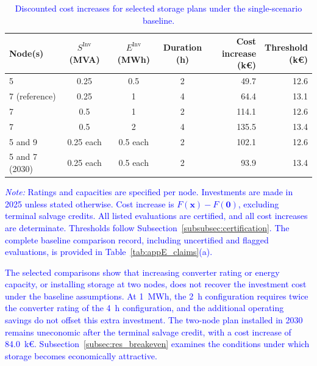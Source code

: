 \documentclass[preprint,12pt]{elsarticle}
\begin{document}
\begin{table}[htbp!]
    \centering
    \caption{\textcolor{blue}{Discounted cost increases for selected storage
    plans under the single-scenario baseline.}}
    \label{tab:res_value_ladder}
    \footnotesize
    \setlength{\tabcolsep}{4pt}
    \begin{tabular}{l c c c r r}
        \toprule
        Node(s)
        & \shortstack{$S^{\text{Inv}}$\\(MVA)}
        & \shortstack{$E^{\text{Inv}}$\\(MWh)}
        & \shortstack{Duration\\(h)}
        & \shortstack{Cost increase\\(k\euro{})}
        & \shortstack{Threshold\\(k\euro{})} \\
        \midrule
        5               & 0.25 & 0.5 & 2 & 49.7 & 12.6 \\
        7 (reference)   & 0.25 & 1 & 4 & 64.4 & 13.1 \\
        7               & 0.5 & 1 & 2 & 114.1 & 12.6 \\
        7               & 0.5 & 2 & 4 & 135.5 & 13.4 \\
        5 and 9         & 0.25 each & 0.5 each & 2 & 102.1 & 12.6 \\
        5 and 7 (2030)  & 0.25 each & 0.5 each & 2 & 93.9 & 13.4 \\
        \bottomrule
    \end{tabular}
    \par\smallskip
    \begin{minipage}{\linewidth}
        \footnotesize\raggedright
        \textcolor{blue}{\textit{Note:}
        Ratings and capacities are specified per node. Investments are made in 2025 unless stated otherwise.
        Cost increase is $F(\boldsymbol{x})-F(\boldsymbol{0})$, excluding terminal salvage credits.
        All listed evaluations are certified, and all cost increases are determinate. Thresholds follow Subsection~\ref{subsubsec:certification}.
        The complete baseline comparison record, including uncertified and flagged evaluations, is provided in Table~\ref{tab:appE_claims}(a).}
    \end{minipage}
\end{table}

\textcolor{blue}{
    The selected comparisons show that increasing converter rating or energy capacity, or installing storage at two nodes, does not recover the investment cost under the baseline assumptions. 
    At 1~MWh, the 2~h configuration requires twice the converter rating of the 4~h configuration, and the additional operating savings do not offset this extra investment. The two-node plan installed in 2030 remains uneconomic after the terminal salvage credit, with a cost increase of 84.0~k\euro{}.
    Subsection~\ref{subsec:res_breakeven} examines the conditions under which storage becomes economically attractive.
}
\end{document}
